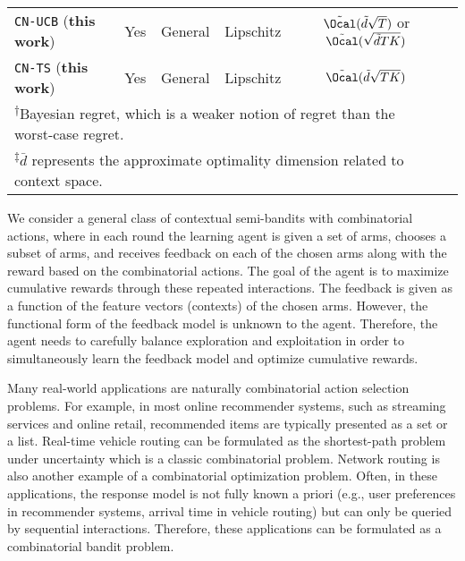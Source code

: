 \documentclass{article}
\theoremstyle{plain}
\begin{document}
\begin{table*}[t!]
\begin{minipage}{\textwidth}
\begin{tabular}{lccccc}
         \texttt{CN-UCB} (\textbf{this work}) & Yes & General & Lipschitz & $\tilde{\Ocal}(\tilde{d} \sqrt{T})$ or $\tilde{\Ocal}(\sqrt{\tilde{d} T K})$ \\
         \texttt{CN-TS} (\textbf{this work}) & Yes & General & Lipschitz & $\tilde{\Ocal}(\tilde{d} \sqrt{T K})$ \\
         \bottomrule
         \multicolumn{5}{l}{\textsuperscript{$\dag$}\footnotesize{Bayesian regret, which is a weaker notion of regret than the worst-case regret.}} \\
         \multicolumn{5}{l}{\textsuperscript{$\ddag$}\footnotesize{$\bar{d}$ represents the approximate optimality dimension related to context space.}}
    \end{tabular}
    \label{tab:comparison table}    
\end{minipage}
\end{table*}


We consider a general class of contextual semi-bandits with combinatorial actions, where in each round the learning agent is given a set of arms, chooses a subset of arms, and receives feedback on each of the chosen arms along with the reward based on the combinatorial actions. The goal of the agent is to maximize cumulative rewards through these repeated interactions.
The feedback is given as a function of the feature vectors (contexts) of the chosen arms. However, the functional form of the feedback model is unknown to the agent. 
Therefore, the agent needs to carefully balance exploration and exploitation in order to simultaneously learn the feedback model and optimize cumulative rewards. 

Many real-world applications are naturally combinatorial action selection problems. For example, in most online recommender systems, such as streaming services and online retail, recommended items are typically presented as a set or a list. 
Real-time vehicle routing can be formulated as the shortest-path problem under uncertainty which is a classic combinatorial problem. 
Network routing is also another example of a combinatorial optimization problem. 
Often, in these applications, the response model is not fully known a priori (e.g., user preferences in recommender systems, arrival time in vehicle routing) 
but can only be queried by sequential interactions. 
Therefore, these applications can be formulated as a combinatorial bandit problem.
\end{document}
